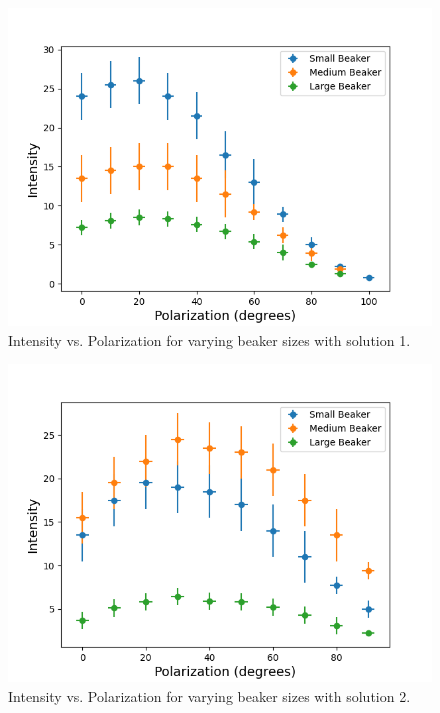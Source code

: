 \begin{figure}[H]
    \begin{center}
        \includegraphics[width=\columnwidth]{../figures/solution1.png}
    \end{center}
    \caption{Intensity vs. Polarization for varying beaker sizes with solution 1.}
    \label{fig:solution1}
\end{figure}

\begin{figure}[H]
    \begin{center}
        \includegraphics[width=\columnwidth]{../figures/solution2.png}
    \end{center}
    \caption{Intensity vs. Polarization for varying beaker sizes with solution 2.}
    \label{fig:solution2}
\end{figure}

